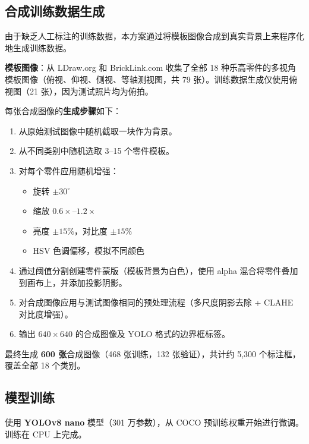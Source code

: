 \documentclass[12pt,a4paper]{ctexart}
\begin{document}
\subsection{合成训练数据生成}

由于缺乏人工标注的训练数据，本方案通过将模板图像合成到真实背景上来程序化地生成训练数据。

\textbf{模板图像}：从 LDraw.org 和 BrickLink.com 收集了全部 18 种乐高零件的多视角模板图像（俯视、仰视、侧视、等轴测视图，共 79 张）。训练数据生成仅使用俯视图（21 张），因为测试照片均为俯拍。

每张合成图像的\textbf{生成步骤}如下：

\begin{enumerate}
    \item 从原始测试图像中随机截取一块作为背景。
    \item 从不同类别中随机选取 3--15 个零件模板。
    \item 对每个零件应用随机增强：
    \begin{itemize}
        \item 旋转 $\pm 30^\circ$
        \item 缩放 $0.6\times$--$1.2\times$
        \item 亮度 $\pm 15\%$，对比度 $\pm 15\%$
        \item HSV 色调偏移，模拟不同颜色
    \end{itemize}
    \item 通过阈值分割创建零件蒙版（模板背景为白色），使用 alpha 混合将零件叠加到画布上，并添加投影阴影。
    \item 对合成图像应用与测试图像相同的预处理流程（多尺度阴影去除 + CLAHE 对比度增强）。
    \item 输出 $640\times640$ 的合成图像及 YOLO 格式的边界框标签。
\end{enumerate}

最终生成 \textbf{600 张}合成图像（468 张训练，132 张验证），共计约 5,300 个标注框，覆盖全部 18 个类别。

\subsection{模型训练}

使用 \textbf{YOLOv8 nano} 模型（301 万参数），从 COCO 预训练权重开始进行微调。训练在 CPU 上完成。
\end{document}

